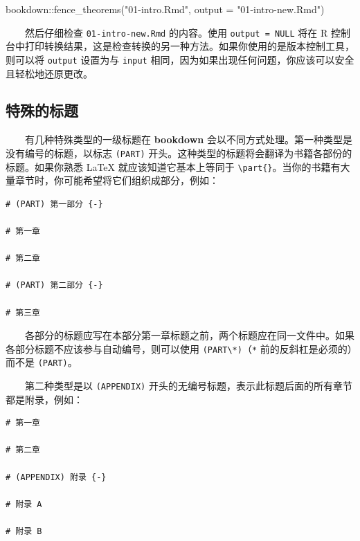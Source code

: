 \documentclass[
  12pt,
]{krantz}
\newenvironment{Shaded}{\begin{snugshade}}{\end{snugshade}}
\newcommand{\AttributeTok}[1]{\textcolor[rgb]{0.77,0.63,0.00}{#1}}
\newcommand{\FunctionTok}[1]{\textcolor[rgb]{0.00,0.00,0.00}{#1}}
\newcommand{\NormalTok}[1]{#1}
\newcommand{\SpecialCharTok}[1]{\textcolor[rgb]{0.00,0.00,0.00}{#1}}
\newcommand{\StringTok}[1]{\textcolor[rgb]{0.31,0.60,0.02}{#1}}
\theoremstyle{definition}
\theoremstyle{definition}
\theoremstyle{definition}
\theoremstyle{definition}
\theoremstyle{remark}
\begin{document}
\begin{Shaded}
\begin{Highlighting}[]
\NormalTok{bookdown}\SpecialCharTok{::}\FunctionTok{fence\_theorems}\NormalTok{(}\StringTok{"01{-}intro.Rmd"}\NormalTok{, }\AttributeTok{output =} \StringTok{"01{-}intro{-}new.Rmd"}\NormalTok{)}
\end{Highlighting}
\end{Shaded}

  然后仔细检查 \texttt{01-intro-new.Rmd} 的内容。使用 \texttt{output\ =\ NULL} 将在 R 控制台中打印转换结果，这是检查转换的另一种方法。如果你使用的是版本控制工具，则可以将 \texttt{output} 设置为与 \texttt{input} 相同，因为如果出现任何问题，你应该可以安全且轻松地还原更改。

\hypertarget{ux7279ux6b8aux7684ux6807ux9898}{%
\subsection{特殊的标题}\label{ux7279ux6b8aux7684ux6807ux9898}}

  有几种特殊类型的一级标题在 \textbf{bookdown} 会以不同方式处理。第一种类型是没有编号的标题，以标志 \texttt{(PART)} 开头。这种类型的标题将会翻译为书籍各部份的标题。如果你熟悉 LaTeX 就应该知道它基本上等同于 \texttt{\textbackslash{}part\{\}}。当你的书籍有大量章节时，你可能希望将它们组织成部分，例如：

\begin{verbatim}
# (PART) 第一部分 {-} 

# 第一章

# 第二章

# (PART) 第二部分 {-} 

# 第三章
\end{verbatim}

  各部分的标题应写在本部分第一章标题之前，两个标题应在同一文件中。如果各部分标题不应该参与自动编号，则可以使用 \texttt{(PART\textbackslash{}*)}（\texttt{*} 前的反斜杠是必须的）而不是 \texttt{(PART)}。

  第二种类型是以 \texttt{(APPENDIX)} 开头的无编号标题，表示此标题后面的所有章节都是附录，例如：

\begin{verbatim}
# 第一章

# 第二章

# (APPENDIX) 附录 {-} 

# 附录 A

# 附录 B
\end{verbatim}
\end{document}
